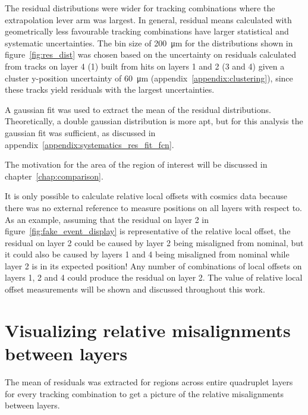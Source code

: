 The residual distributions were wider for tracking combinations where the extrapolation lever arm was largest. In general, residual means calculated with geometrically less favourable tracking combinations have larger statistical and systematic uncertainties. The bin size of \SI{200}{\micro\meter} for the distributions shown in figure~\ref{fig:res_dist} was chosen based on the uncertainty on residuals calculated from tracks on layer 4 (1) built from hits on layers 1 and 2 (3 and 4) given a cluster y-position uncertainty of \SI{60}{\micro\meter} (appendix~\ref{appendix:clustering}), since these tracks yield residuals with the largest uncertainties.

A gaussian fit was used to extract the mean of the residual distributions. Theoretically, a double gaussian distribution is more apt, but for this analysis the gaussian fit was sufficient, as discussed in appendix~\ref{appendix:systematics_res_fit_fcn}.


The motivation for the area of the region of interest will be discussed in chapter~\ref{chap:comparison}.

It is only possible to calculate relative local offsets with cosmics data because there was no external reference to measure positions on all layers with respect to. As an example, assuming that the residual on layer 2 in figure~\ref{fig:fake_event_display} is representative of the relative local offset, the residual on layer 2 could be caused by layer 2 being misaligned from nominal, but it could also be caused by layers 1 and 4 being misaligned from nominal while layer 2 is in its expected position! Any number of combinations of local offsets on layers 1, 2 and 4 could produce the residual on layer 2. The value of relative local offset measurements will be shown and discussed throughout this work.

\section{Visualizing relative misalignments between layers}

The mean of residuals was extracted for regions across entire quadruplet layers for every tracking combination to get a picture of the relative misalignments between layers. 

